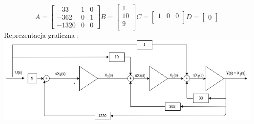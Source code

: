 \documentclass[a4paper, 11pt]{article}
\begin{document}
\begin{enumerate}
 \[ A = 	
 \begin{bmatrix}
   -33 & 1 & 0 \\
   -362 & 0 & 1\\
   -1320 & 0 & 0
  \end{bmatrix}
B = 
\begin{bmatrix}
	1 \\
	10 \\
	9 \\
\end{bmatrix}
C = 
\begin{bmatrix}
	1 & 0 & 0 \\
\end{bmatrix}
D = \begin{bmatrix}
0 \end{bmatrix}
\]
Reprezentacja graficzna : 
\includegraphics{Wariant2.jpg}
\end{enumerate}
\end{document}
